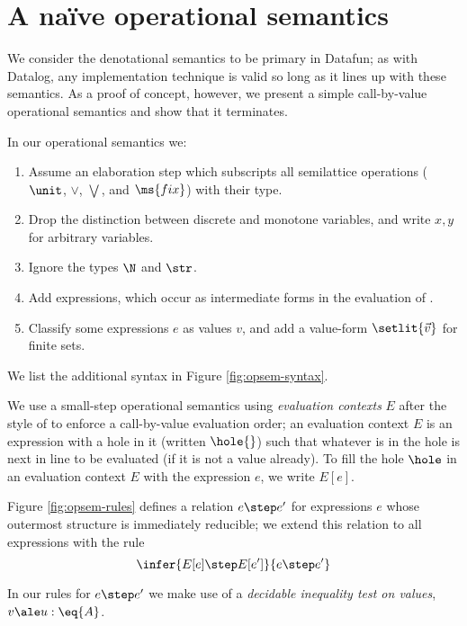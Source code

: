 
\section{A na\"ive operational semantics}

We consider the denotational semantics to be primary in Datafun; as with
Datalog, any implementation technique is valid so long as it lines up with these
semantics. As a proof of concept, however, we present a simple call-by-value
operational semantics and show that it terminates.

In our operational semantics we:
\begin{enumerate}
\item Assume an elaboration step which subscripts all semilattice operations
  ($\unit$, $\vee$, $\bigvee$, and $\ms{fix}$) with their type.
\item Drop the distinction between discrete and monotone variables, and write
  $x,y$ for arbitrary variables.
\item Ignore the types $\N$ and $\str$. 
\item Add  expressions, which occur as intermediate forms in the
  evaluation of .
\item Classify some expressions $e$ as values $v$, and add a value-form
  $\setlit{\vec{v}}$ for finite sets.
\end{enumerate}
We list the additional syntax in Figure \ref{fig:opsem-syntax}.

We use a small-step operational semantics using \emph{evaluation contexts} $E$
after the style of \citet{reduction-contexts} to enforce a call-by-value
evaluation order; an evaluation context $E$ is an expression with a hole in it
(written $\hole{}$) such that whatever is in the hole is next in line to be
evaluated (if it is not a value already). To fill the hole $\hole$ in an
evaluation context $E$ with the expression $e$, we write $E[e]$.

Figure \ref{fig:opsem-rules} defines a relation $e \step e'$ for expressions $e$
whose outermost structure is immediately reducible; we extend this relation to
all expressions with the rule
\[\infer{E[e] \step E[e']}{e \step e'}\]

In our rules for $e \step e'$ we make use of a \emph{decidable inequality test
  on values}, $v \ale u : \eq{A}$.
